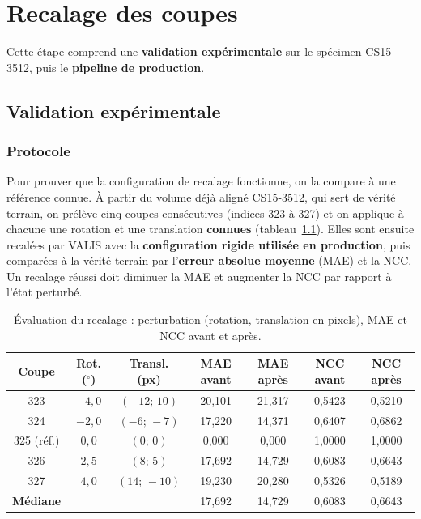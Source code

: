 \documentclass[12pt,a4paper]{report}
\begin{document}
\chapter{Recalage des coupes}\label{ch:recalage}

Cette étape comprend une \textbf{validation expérimentale} sur le spécimen CS15-3512, puis le \textbf{pipeline de production}.

\section{Validation expérimentale}

\subsection{Protocole}

Pour prouver que la configuration de recalage fonctionne, on la compare à une référence connue. À partir du volume déjà aligné CS15-3512, qui sert de vérité terrain, on prélève cinq coupes consécutives (indices 323 à 327) et on applique à chacune une rotation et une translation \textbf{connues} (tableau~\ref{tab:resA}). Elles sont ensuite recalées par VALIS avec la \textbf{configuration rigide utilisée en production}, puis comparées à la vérité terrain par l'\textbf{erreur absolue moyenne} (MAE) et la NCC. Un recalage réussi doit diminuer la MAE et augmenter la NCC par rapport à l'état perturbé.

\begin{table}[H]
\centering
\small
\setlength{\tabcolsep}{4pt}
\begin{tabular}{ccccccc}
\toprule
\textbf{Coupe} & \textbf{Rot. ($^\circ$)} & \textbf{Transl. (px)} & \textbf{MAE avant} & \textbf{MAE après} & \textbf{NCC avant} & \textbf{NCC après} \\
\midrule
323 & $-4{,}0$ & $(-12;\,10)$ & 20,101 & 21,317 & 0,5423 & 0,5210 \\
324 & $-2{,}0$ & $(-6;\,-7)$ & 17,220 & 14,371 & 0,6407 & 0,6862 \\
325 (réf.) & $0{,}0$ & $(0;\,0)$ & 0,000 & 0,000 & 1,0000 & 1,0000 \\
326 & $2{,}5$ & $(8;\,5)$ & 17,692 & 14,729 & 0,6083 & 0,6643 \\
327 & $4{,}0$ & $(14;\,-10)$ & 19,230 & 20,280 & 0,5326 & 0,5189 \\
\midrule
\textbf{Médiane} & & & 17,692 & 14,729 & 0,6083 & 0,6643 \\
\bottomrule
\end{tabular}
\caption[Évaluation du recalage (MAE et NCC)]{Évaluation du recalage : perturbation (rotation, translation en pixels), MAE et NCC avant et après.}
\label{tab:resA}
\end{table}
\end{document}
